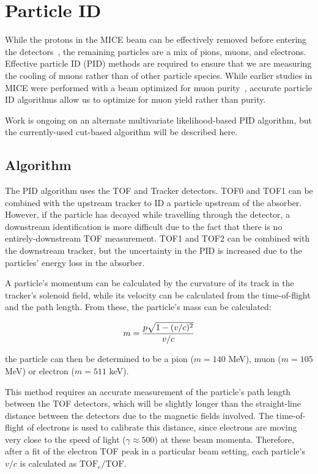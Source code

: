 \graphicspath{{07-PID/Figures/}}

\section{Particle ID}
\label{Sect:PID}

While the protons in the MICE beam can be effectively removed before entering the detectors~\cite{proton_absorber}, the remaining particles are a mix of pions, muons, and electrons.  Effective particle ID (PID) methods are required to ensure that we are measuring the cooling of muons rather than of other particle species.  While earlier studies in MICE were performed with a beam optimized for muon purity~\cite{2016JInst..11P3001A}, accurate particle ID algorithms allow us to optimize for muon yield rather than purity.

{\color{red}Work is ongoing on an alternate multivariate likelihood-based PID algorithm, but the currently-used cut-based algorithm will be described here.}

\subsection{Algorithm}
\label{SubSect:PID_Algo}

The PID algorithm uses the TOF and Tracker detectors.  TOF0 and TOF1 can be combined with the upstream tracker to ID a particle upstream of the absorber.  However, if the particle has decayed while travelling through the detector, a downstream identification is more difficult due to the fact that there is no entirely-downstream TOF measurement.  TOF1 and TOF2 can be combined with the downstream tracker, but the uncertainty in the PID is increased due to the particles' energy loss in the absorber.

A particle's momentum can be calculated by the curvature of its track in the tracker's solenoid field, while its velocity can be calculated from the time-of-flight and the path length.  From these, the particle's mass can be calculated:

\begin{equation}
\label{eq:pid_mass_calc} m = {p \sqrt{1-(v/c)^2} \over v/c}
\end{equation}

the particle can then be determined to be a pion ($m=140$ MeV), muon ($m=105$ MeV) or electron ($m=511$ keV).

This method requires an accurate measurement of the particle's path length between the TOF detectors, which will be slightly longer than the straight-line distance between the detectors due to the magnetic fields involved.  The time-of-flight of electrons is used to calibrate this distance, since electrons are moving very close to the speed of light ($\gamma \approx 500$) at these beam momenta.  Therefore, after a fit of the electron TOF peak in a particular beam setting, each particle's $v/c$ is calculated as $\mathrm{TOF}_e / \mathrm{TOF}$.

